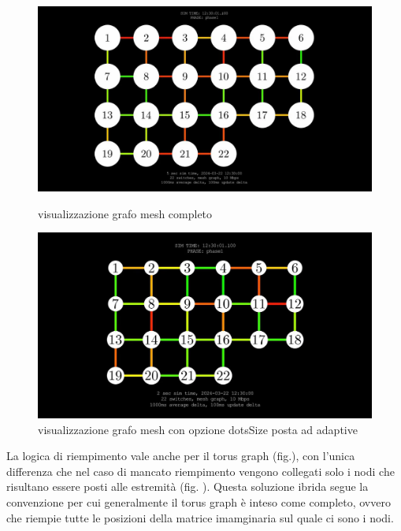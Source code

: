 \documentclass[binding=0.6cm]{sapthesis}
\begin{document}
\begin{figure}[h]
    \centering
    \begin{minipage}{0.48\textwidth}
      \includegraphics[width=\linewidth]{immagini/mesh_not_full.JPG}
      \caption{visualizzazione grafo mesh completo}
      \label{fig:mesh_not_full}
    \end{minipage}\hfill
    \begin{minipage}{0.48\textwidth}
      \includegraphics[width=\linewidth]{immagini/adaptive_dots_example.JPG}
      \caption{visualizzazione grafo mesh con opzione dotsSize posta ad adaptive}
      \label{fig:adaptive_dots_example}
    \end{minipage}
\end{figure}

La logica di riempimento vale anche per il torus graph (fig.), con l'unica differenza che nel caso di mancato riempimento vengono collegati solo i nodi
che risultano essere posti alle estremità (fig. ). Questa soluzione ibrida segue la convenzione per cui generalmente il torus graph è inteso come completo,
ovvero che riempie tutte le posizioni della matrice imamginaria sul quale ci sono i nodi.
\end{document}
